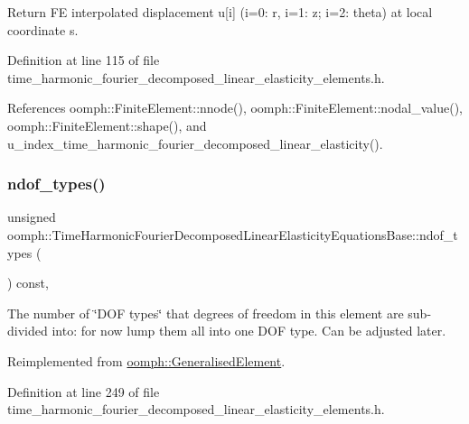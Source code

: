 Return FE interpolated displacement u\mbox{[}i\mbox{]} (i=0\+: r, i=1\+: z; i=2\+: theta) at local coordinate s. 



Definition at line 115 of file time\+\_\+harmonic\+\_\+fourier\+\_\+decomposed\+\_\+linear\+\_\+elasticity\+\_\+elements.\+h.



References oomph\+::\+Finite\+Element\+::nnode(), oomph\+::\+Finite\+Element\+::nodal\+\_\+value(), oomph\+::\+Finite\+Element\+::shape(), and u\+\_\+index\+\_\+time\+\_\+harmonic\+\_\+fourier\+\_\+decomposed\+\_\+linear\+\_\+elasticity().

\mbox{\label{classoomph_1_1TimeHarmonicFourierDecomposedLinearElasticityEquationsBase_a7fc55ec08c580274e0f0de664c43c249}} 
\subsubsection{\texorpdfstring{ndof\+\_\+types()}{ndof\_types()}}
{\footnotesize\ttfamily unsigned oomph\+::\+Time\+Harmonic\+Fourier\+Decomposed\+Linear\+Elasticity\+Equations\+Base\+::ndof\+\_\+types (\begin{DoxyParamCaption}{ }\end{DoxyParamCaption}) const\hspace{0.3cm}{\ttfamily [inline]}, {\ttfamily [virtual]}}



The number of \char`\"{}\+D\+O\+F types\char`\"{} that degrees of freedom in this element are sub-\/divided into\+: for now lump them all into one D\+OF type. Can be adjusted later. 



Reimplemented from \hyperlink{classoomph_1_1GeneralisedElement_a0c6037a870597b35dcf1c780710b9a56}{oomph\+::\+Generalised\+Element}.



Definition at line 249 of file time\+\_\+harmonic\+\_\+fourier\+\_\+decomposed\+\_\+linear\+\_\+elasticity\+\_\+elements.\+h.

